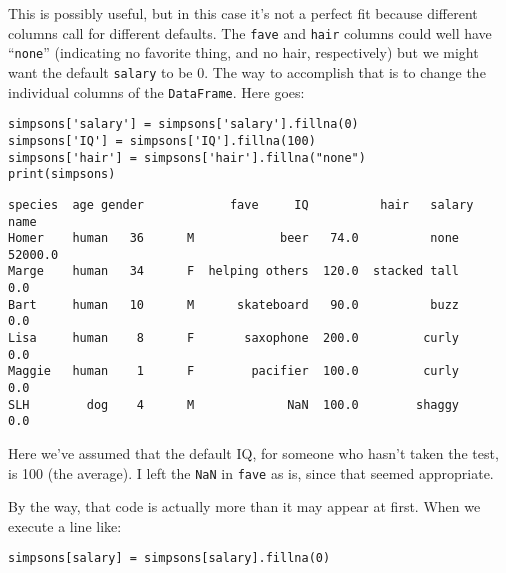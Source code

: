 This is possibly useful, but in this case it's not a perfect fit because
different columns call for different defaults. The \texttt{fave} and
\texttt{hair} columns could well have ``\texttt{none}'' (indicating no
favorite thing, and no hair, respectively) but we might want the default
\texttt{salary} to be 0. The way to accomplish that is to change the individual
columns of the \texttt{DataFrame}. Here goes:

\begin{Verbatim}[fontsize=\small,samepage=true,frame=single,framesep=3mm]
simpsons['salary'] = simpsons['salary'].fillna(0)
simpsons['IQ'] = simpsons['IQ'].fillna(100)
simpsons['hair'] = simpsons['hair'].fillna("none")
print(simpsons)
\end{Verbatim}
\vspace{-.2in}

\label{finalSimpsons}

\begin{Verbatim}[fontsize=\small,samepage=true,frame=leftline,framesep=5mm,framerule=1mm]
       species  age gender            fave     IQ          hair   salary
name                                                                    
Homer    human   36      M            beer   74.0          none  52000.0
Marge    human   34      F  helping others  120.0  stacked tall      0.0
Bart     human   10      M      skateboard   90.0          buzz      0.0
Lisa     human    8      F       saxophone  200.0         curly      0.0
Maggie   human    1      F        pacifier  100.0         curly      0.0
SLH        dog    4      M             NaN  100.0        shaggy      0.0
\end{Verbatim}

Here we've assumed that the default IQ, for someone who hasn't taken the test,
is 100 (the average). I left the \texttt{NaN} in \texttt{fave} as is, since
that seemed appropriate.

\begin{samepage}
By the way, that code is actually more than it may appear at first. When we
execute a line like:

\vspace{-.1in}
\begin{center}
\texttt{simpsons[\textquotesingle salary\textquotesingle] =
simpsons[\textquotesingle salary\textquotesingle].fillna(0)}
\end{center}
\vspace{-.1in}
\end{samepage}

